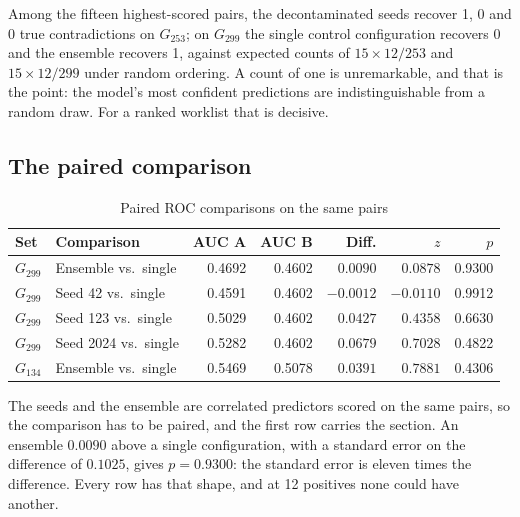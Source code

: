 Among the fifteen highest-scored pairs, the decontaminated seeds recover 1, 0 and
0 true contradictions on $G_{253}$; on $G_{299}$ the single control configuration
recovers 0 and the ensemble recovers 1, against expected counts of
$15 \times 12/253$ and $15 \times 12/299$ under random ordering. A count of one
is unremarkable, and that is the point: the model's most confident predictions
are indistinguishable from a random draw. For a ranked worklist that is decisive.

\subsection{The paired comparison}

\begin{table}[H]
\caption{Paired ROC comparisons on the same pairs}
\centering
\small
\begin{tabular}{llrrrrr}
\toprule
\textbf{Set} & \textbf{Comparison} & \textbf{AUC A} & \textbf{AUC B} &
\textbf{Diff.} & \textbf{$z$} & \textbf{$p$} \\
\midrule
$G_{299}$ & Ensemble vs.\ single  & 0.4692 & 0.4602 & $0.0090$  & $0.0878$  & 0.9300 \\
$G_{299}$ & Seed 42 vs.\ single   & 0.4591 & 0.4602 & $-0.0012$ & $-0.0110$ & 0.9912 \\
$G_{299}$ & Seed 123 vs.\ single  & 0.5029 & 0.4602 & $0.0427$  & $0.4358$  & 0.6630 \\
$G_{299}$ & Seed 2024 vs.\ single & 0.5282 & 0.4602 & $0.0679$  & $0.7028$  & 0.4822 \\
$G_{134}$ & Ensemble vs.\ single  & 0.5469 & 0.5078 & $0.0391$  & $0.7881$  & 0.4306 \\
\bottomrule
\end{tabular}
\label{tab:delong}
\end{table}

The seeds and the ensemble are correlated predictors scored on the same pairs, so
the comparison has to be paired, and the first row carries the section. An
ensemble $0.0090$ above a single configuration, with a standard error on the
difference of $0.1025$, gives $p = 0.9300$: the standard error is eleven times
the difference. Every row has that shape, and at 12 positives none could have
another.


